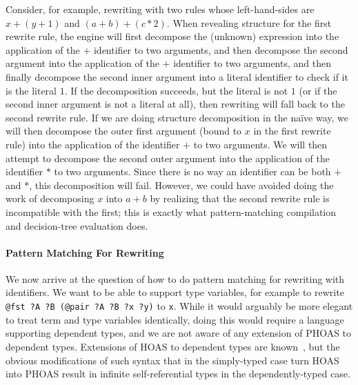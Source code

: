 Consider, for example, rewriting with two rules whose left-hand-sides are $x + (y + 1)$ and $(a + b) + (c * 2)$.
When revealing structure for the first rewrite rule, the engine will first decompose the (unknown) expression into the application of the $+$ identifier to two arguments, and then decompose the second argument into the application of the $+$ identifier to two arguments, and then finally decompose the second inner argument into a literal identifier to check if it is the literal $1$.
If the decomposition succeeds, but the literal is not $1$ (or if the second inner argument is not a literal at all), then rewriting will fall back to the second rewrite rule.
If we are doing structure decomposition in the naïve way, we will then decompose the outer first argument (bound to $x$ in the first rewrite rule) into the application of the identifier $+$ to two arguments.
We will then attempt to decompose the second outer argument into the application of the identifier $*$ to two arguments.
Since there is no way an identifier can be both $+$ and $*$, this decomposition will fail.
However, we could have avoided doing the work of decomposing $x$ into $a + b$ by realizing that the second rewrite rule is incompatible with the first; this is exactly what pattern-matching compilation and decision-tree evaluation does.

\paragraph{Pattern Matching For Rewriting}
We now arrive at the question of how to do pattern matching for rewriting with identifiers.
We want to be able to support type variables, for example to rewrite \texttt{@fst ?A ?B (@pair ?A ?B ?x ?y)} to \texttt{x}.
While it would arguably be more elegant to treat term and type variables identically, doing this would require a language supporting dependent types, and we are not aware of any extension of PHOAS to dependent types.
Extensions of HOAS to dependent types are known~\cite{Outrageous2010McBride}, but the obvious modifications of such syntax that in the simply-typed case turn HOAS into PHOAS result in infinite self-referential types in the dependently-typed case.

